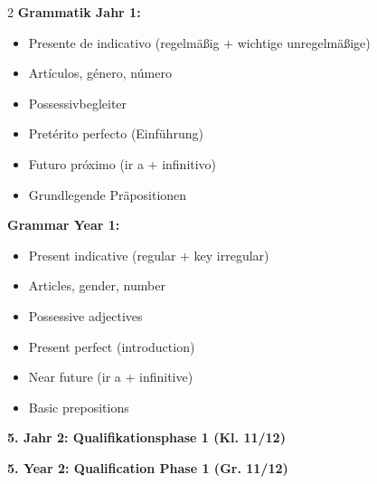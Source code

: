 \documentclass[10pt,a4paper]{article}
\newcommand{\secbil}[2]{%
\vspace{6pt}
\noindent\colorbox{spaet}{\parbox{0.48\textwidth}{\color{white}\bfseries\small #1}}%
\hfill%
\colorbox{english}{\parbox{0.48\textwidth}{\color{white}\bfseries\small #2}}
\vspace{3pt}
}
\begin{document}

\vspace{2mm}

\begin{paracol}{2}
\small
\textbf{Grammatik Jahr 1:}
\begin{itemize}[noitemsep,topsep=2pt]
\item Presente de indicativo (regelmäßig + wichtige unregelmäßige)
\item Artículos, género, número
\item Possessivbegleiter
\item Pretérito perfecto (Einführung)
\item Futuro próximo (ir a + infinitivo)
\item Grundlegende Präpositionen
\end{itemize}

\switchcolumn

\small\color{english}
\textbf{Grammar Year 1:}
\begin{itemize}[noitemsep,topsep=2pt]
\item Present indicative (regular + key irregular)
\item Articles, gender, number
\item Possessive adjectives
\item Present perfect (introduction)
\item Near future (ir a + infinitive)
\item Basic prepositions
\end{itemize}

\end{paracol}

\secbil{5. Jahr 2: Qualifikationsphase 1 (Kl. 11/12)}{5. Year 2: Qualification Phase 1 (Gr. 11/12)}
\end{document}

